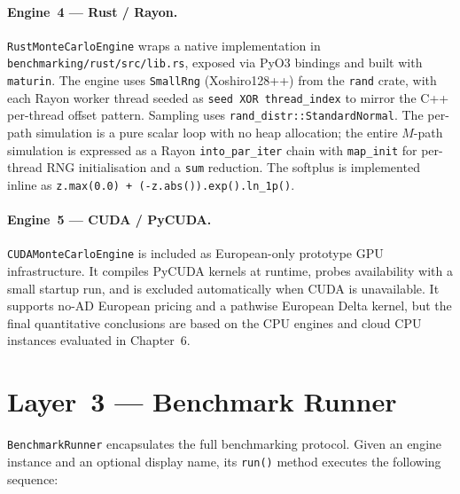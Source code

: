 \paragraph{Engine~4 --- Rust / Rayon.}
\texttt{RustMonteCarloEngine} wraps a native implementation in
\texttt{benchmarking/rust/src/lib.rs}, exposed via PyO3 bindings and built with
\texttt{maturin}. The engine uses \texttt{SmallRng} (Xoshiro128++) from the
\texttt{rand} crate, with each Rayon worker thread seeded as
\texttt{seed XOR thread\_index} to mirror the C++ per-thread offset pattern.
Sampling uses \texttt{rand\_distr::StandardNormal}. The per-path simulation is a
pure scalar loop with no heap allocation; the entire $M$-path simulation is
expressed as a Rayon \texttt{into\_par\_iter} chain with \texttt{map\_init} for
per-thread RNG initialisation and a \texttt{sum} reduction. The softplus
is implemented inline as \texttt{z.max(0.0) + (-z.abs()).exp().ln\_1p()}.

\paragraph{Engine~5 --- CUDA / PyCUDA.}
\texttt{CUDAMonteCarloEngine} is included as European-only prototype GPU
infrastructure. It compiles PyCUDA kernels at runtime, probes availability with
a small startup run, and is excluded automatically when CUDA is unavailable. It
supports no-AD European pricing and a pathwise European Delta kernel, but the
final quantitative conclusions are based on the CPU engines and cloud CPU
instances evaluated in Chapter~6.

\section{Layer~3 --- Benchmark Runner}
\label{sec:runner-layer}

\texttt{BenchmarkRunner} encapsulates the full benchmarking protocol. Given an
engine instance and an optional display name, its \texttt{run()} method executes
the following sequence:

